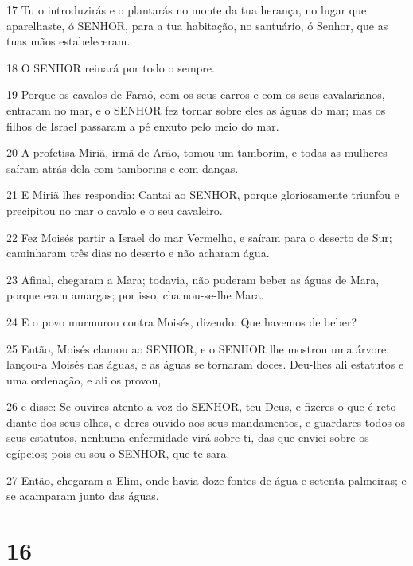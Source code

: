 \par 17 Tu o introduzirás e o plantarás no monte da tua herança, no lugar que aparelhaste, ó SENHOR, para a tua habitação, no santuário, ó Senhor, que as tuas mãos estabeleceram.
\par 18 O SENHOR reinará por todo o sempre.
\par 19 Porque os cavalos de Faraó, com os seus carros e com os seus cavalarianos, entraram no mar, e o SENHOR fez tornar sobre eles as águas do mar; mas os filhos de Israel passaram a pé enxuto pelo meio do mar.
\par 20 A profetisa Miriã, irmã de Arão, tomou um tamborim, e todas as mulheres saíram atrás dela com tamborins e com danças.
\par 21 E Miriã lhes respondia: Cantai ao SENHOR, porque gloriosamente triunfou e precipitou no mar o cavalo e o seu cavaleiro.
\par 22 Fez Moisés partir a Israel do mar Vermelho, e saíram para o deserto de Sur; caminharam três dias no deserto e não acharam água.
\par 23 Afinal, chegaram a Mara; todavia, não puderam beber as águas de Mara, porque eram amargas; por isso, chamou-se-lhe Mara.
\par 24 E o povo murmurou contra Moisés, dizendo: Que havemos de beber?
\par 25 Então, Moisés clamou ao SENHOR, e o SENHOR lhe mostrou uma árvore; lançou-a Moisés nas águas, e as águas se tornaram doces. Deu-lhes ali estatutos e uma ordenação, e ali os provou,
\par 26 e disse: Se ouvires atento a voz do SENHOR, teu Deus, e fizeres o que é reto diante dos seus olhos, e deres ouvido aos seus mandamentos, e guardares todos os seus estatutos, nenhuma enfermidade virá sobre ti, das que enviei sobre os egípcios; pois eu sou o SENHOR, que te sara.
\par 27 Então, chegaram a Elim, onde havia doze fontes de água e setenta palmeiras; e se acamparam junto das águas.

\chapter{16}


